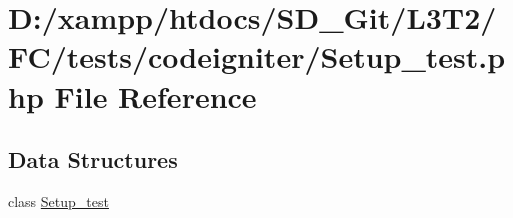 \hypertarget{tests_2codeigniter_2_setup__test_8php}{}\section{D\+:/xampp/htdocs/\+S\+D\+\_\+\+Git/\+L3\+T2/\+F\+C/tests/codeigniter/\+Setup\+\_\+test.php File Reference}
\label{tests_2codeigniter_2_setup__test_8php}
\subsection*{Data Structures}
\begin{DoxyCompactItemize}
\item 
class \hyperlink{class_setup__test}{Setup\+\_\+test}
\end{DoxyCompactItemize}
